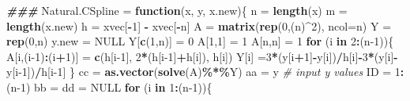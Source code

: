 \documentclass[
]{book}
\newenvironment{Shaded}{\begin{snugshade}}{\end{snugshade}}
\newcommand{\AttributeTok}[1]{\textcolor[rgb]{0.13,0.29,0.53}{#1}}
\newcommand{\CommentTok}[1]{\textcolor[rgb]{0.56,0.35,0.01}{\textit{#1}}}
\newcommand{\ConstantTok}[1]{\textcolor[rgb]{0.56,0.35,0.01}{#1}}
\newcommand{\ControlFlowTok}[1]{\textcolor[rgb]{0.13,0.29,0.53}{\textbf{#1}}}
\newcommand{\DecValTok}[1]{\textcolor[rgb]{0.00,0.00,0.81}{#1}}
\newcommand{\DocumentationTok}[1]{\textcolor[rgb]{0.56,0.35,0.01}{\textbf{\textit{#1}}}}
\newcommand{\FunctionTok}[1]{\textcolor[rgb]{0.13,0.29,0.53}{\textbf{#1}}}
\newcommand{\NormalTok}[1]{#1}
\newcommand{\OtherTok}[1]{\textcolor[rgb]{0.56,0.35,0.01}{#1}}
\newcommand{\SpecialCharTok}[1]{\textcolor[rgb]{0.81,0.36,0.00}{\textbf{#1}}}
\begin{document}
\begin{Shaded}
\begin{Highlighting}[]
\DocumentationTok{\#\#\#}
\NormalTok{Natural.CSpline }\OtherTok{=} \ControlFlowTok{function}\NormalTok{(x, }
\NormalTok{                           y, }
\NormalTok{                           x.new)\{}
\NormalTok{  n }\OtherTok{=} \FunctionTok{length}\NormalTok{(x)}
\NormalTok{  m }\OtherTok{=} \FunctionTok{length}\NormalTok{(x.new)}
\NormalTok{  h }\OtherTok{=}\NormalTok{ xvec[}\SpecialCharTok{{-}}\DecValTok{1}\NormalTok{] }\SpecialCharTok{{-}}\NormalTok{ xvec[}\SpecialCharTok{{-}}\NormalTok{n]}
\NormalTok{  A }\OtherTok{=} \FunctionTok{matrix}\NormalTok{(}\FunctionTok{rep}\NormalTok{(}\DecValTok{0}\NormalTok{,(n)}\SpecialCharTok{\^{}}\DecValTok{2}\NormalTok{), }\AttributeTok{ncol=}\NormalTok{n)}
\NormalTok{  Y }\OtherTok{=} \FunctionTok{rep}\NormalTok{(}\DecValTok{0}\NormalTok{,n)}
\NormalTok{  y.new }\OtherTok{=} \ConstantTok{NULL}
\NormalTok{  Y[}\FunctionTok{c}\NormalTok{(}\DecValTok{1}\NormalTok{,n)] }\OtherTok{=} \DecValTok{0}
\NormalTok{  A[}\DecValTok{1}\NormalTok{,}\DecValTok{1}\NormalTok{] }\OtherTok{=} \DecValTok{1}
\NormalTok{  A[n,n] }\OtherTok{=} \DecValTok{1}
  \ControlFlowTok{for}\NormalTok{ (i }\ControlFlowTok{in} \DecValTok{2}\SpecialCharTok{:}\NormalTok{(n}\DecValTok{{-}1}\NormalTok{))\{}
\NormalTok{     A[i,(i}\DecValTok{{-}1}\NormalTok{)}\SpecialCharTok{:}\NormalTok{(i}\SpecialCharTok{+}\DecValTok{1}\NormalTok{)] }\OtherTok{=} \FunctionTok{c}\NormalTok{(h[i}\DecValTok{{-}1}\NormalTok{], }\DecValTok{2}\SpecialCharTok{*}\NormalTok{(h[i}\DecValTok{{-}1}\NormalTok{]}\SpecialCharTok{+}\NormalTok{h[i]), h[i])}
\NormalTok{     Y[i] }\OtherTok{=}\DecValTok{3}\SpecialCharTok{*}\NormalTok{(y[i}\SpecialCharTok{+}\DecValTok{1}\NormalTok{]}\SpecialCharTok{{-}}\NormalTok{y[i])}\SpecialCharTok{/}\NormalTok{h[i]}\SpecialCharTok{{-}}\DecValTok{3}\SpecialCharTok{*}\NormalTok{(y[i]}\SpecialCharTok{{-}}\NormalTok{y[i}\DecValTok{{-}1}\NormalTok{])}\SpecialCharTok{/}\NormalTok{h[i}\DecValTok{{-}1}\NormalTok{]}
\NormalTok{  \}}
\NormalTok{  cc }\OtherTok{=} \FunctionTok{as.vector}\NormalTok{(}\FunctionTok{solve}\NormalTok{(A)}\SpecialCharTok{\%*\%}\NormalTok{Y)}
\NormalTok{  aa }\OtherTok{=}\NormalTok{ y                }\CommentTok{\# input y values}
\NormalTok{  ID }\OtherTok{=} \DecValTok{1}\SpecialCharTok{:}\NormalTok{(n}\DecValTok{{-}1}\NormalTok{)}
\NormalTok{  bb }\OtherTok{=}\NormalTok{ dd }\OtherTok{=} \ConstantTok{NULL}
  \ControlFlowTok{for}\NormalTok{ (i }\ControlFlowTok{in} \DecValTok{1}\SpecialCharTok{:}\NormalTok{(n}\DecValTok{{-}1}\NormalTok{))\{}

\end{Highlighting}
\end{Shaded}
\end{document}
